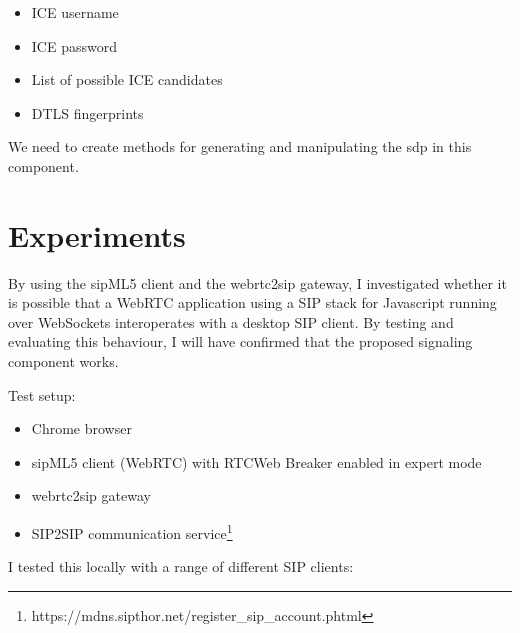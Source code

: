 \begin{itemize}
\item{ICE username}
\item{ICE password}
\item{List of possible ICE candidates}
\item{DTLS fingerprint}s
\end{itemize}

We need to create methods for generating and manipulating the \gls{sdp} in this component.

\section{Experiments}
\label{sec:experiments}
By using the sipML5 client and the webrtc2sip gateway, I investigated whether it is possible that a WebRTC application using a SIP stack for Javascript running over WebSockets interoperates with a desktop SIP client. By testing and evaluating this behaviour, I will have confirmed that the proposed signaling component works.

Test setup:
\begin{itemize}
\item Chrome browser
\item sipML5 client (WebRTC) with RTCWeb Breaker enabled in expert mode
\item webrtc2sip gateway
\item SIP2SIP communication service\footnote{https://mdns.sipthor.net/register\_sip\_account.phtml}
\end{itemize}
I tested this locally with a range of different SIP clients:

